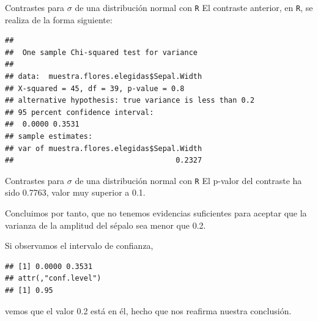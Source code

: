 \documentclass[
  ignorenonframetext,
]{beamer}
\newenvironment{Shaded}{\begin{snugshade}}{\end{snugshade}}
\newcommand{\DataTypeTok}[1]{\textcolor[rgb]{0.13,0.29,0.53}{#1}}
\newcommand{\FloatTok}[1]{\textcolor[rgb]{0.00,0.00,0.81}{#1}}
\newcommand{\KeywordTok}[1]{\textcolor[rgb]{0.13,0.29,0.53}{\textbf{#1}}}
\newcommand{\NormalTok}[1]{#1}
\newcommand{\OperatorTok}[1]{\textcolor[rgb]{0.81,0.36,0.00}{\textbf{#1}}}
\newcommand{\StringTok}[1]{\textcolor[rgb]{0.31,0.60,0.02}{#1}}
\begin{document}
\begin{frame}[fragile]{Contrastes para \(\sigma\) de una distribución
normal con \texttt{R}}
\protect\hypertarget{contrastes-para-sigma-de-una-distribuciuxf3n-normal-con-r-3}{}
El contraste anterior, en \texttt{R}, se realiza de la forma siguiente:

\begin{Shaded}
\end{Shaded}

\begin{verbatim}
## 
##  One sample Chi-squared test for variance
## 
## data:  muestra.flores.elegidas$Sepal.Width
## X-squared = 45, df = 39, p-value = 0.8
## alternative hypothesis: true variance is less than 0.2
## 95 percent confidence interval:
##  0.0000 0.3531
## sample estimates:
## var of muestra.flores.elegidas$Sepal.Width 
##                                     0.2327
\end{verbatim}
\end{frame}

\begin{frame}[fragile]{Contrastes para \(\sigma\) de una distribución
normal con \texttt{R}}
\protect\hypertarget{contrastes-para-sigma-de-una-distribuciuxf3n-normal-con-r-4}{}
El p-valor del contraste ha sido 0.7763, valor muy superior a 0.1.

Concluimos por tanto, que no tenemos evidencias suficientes para aceptar
que la varianza de la amplitud del sépalo sea menor que 0.2.

Si observamos el intervalo de confianza,

\begin{Shaded}
\end{Shaded}

\begin{verbatim}
## [1] 0.0000 0.3531
## attr(,"conf.level")
## [1] 0.95
\end{verbatim}

vemos que el valor 0.2 está en él, hecho que nos reafirma nuestra
conclusión.
\end{frame}
\end{document}
